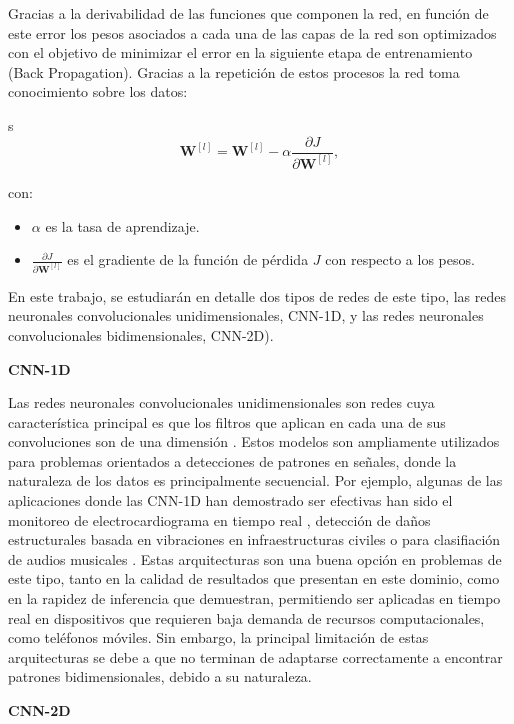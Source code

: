 \documentclass{uathesis-es}
\begin{document}
Gracias a la derivabilidad de las funciones que componen la red, en función de este error los pesos asociados a cada una de las capas de la red son optimizados con el objetivo de minimizar el error en la siguiente etapa de entrenamiento (Back Propagation). Gracias a la repetición de estos procesos la red toma conocimiento sobre los datos:

s
\[
    \mathbf{W}^{[l]} = \mathbf{W}^{[l]} - \alpha \frac{\partial J}{\partial \mathbf{W}^{[l]}},
\]

con:
\begin{itemize}
    \item \(\alpha\) es la tasa de aprendizaje.
    \item \(\frac{\partial J}{\partial \mathbf{W}^{[l]}}\) es el gradiente de la función de pérdida \(J\) con respecto a los pesos.
\end{itemize}

En este trabajo, se estudiarán en detalle dos tipos de redes de este tipo, las redes neuronales convolucionales unidimensionales, CNN-1D, y las redes neuronales convolucionales bidimensionales, CNN-2D).

\textbf{CNN-1D}

Las redes neuronales convolucionales unidimensionales son redes cuya característica principal es que los filtros que aplican en cada una de sus convoluciones son de una dimensión \cite{CNN1D}. Estos modelos son ampliamente utilizados para problemas orientados a detecciones de patrones en señales, donde la naturaleza de los datos es principalmente secuencial. Por ejemplo, algunas de las aplicaciones donde las CNN-1D han demostrado ser efectivas han sido el monitoreo de electrocardiograma en tiempo real \cite{Kiranyaz2017tt}, detección de daños estructurales basada en vibraciones en infraestructuras civiles \cite{khodabandehlou2019vibration} o para clasifiación de audios musicales \cite{allamy20211d}. Estas arquitecturas son una buena opción en problemas de este tipo, tanto en la calidad de resultados que presentan en este dominio, como en la rapidez de inferencia que demuestran, permitiendo ser aplicadas en tiempo real en dispositivos que requieren baja demanda de recursos computacionales, como teléfonos móviles. Sin embargo, la principal limitación de estas arquitecturas se debe a que no terminan de adaptarse correctamente a encontrar patrones bidimensionales, debido a su naturaleza.

\textbf{CNN-2D}
\end{document}
